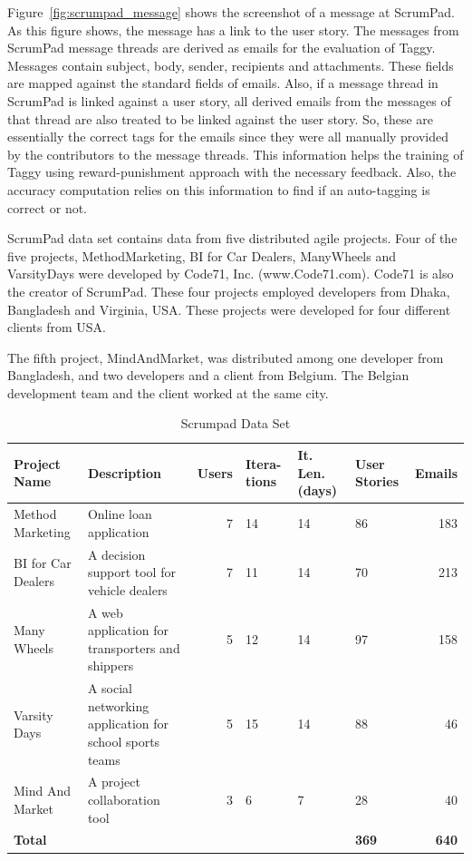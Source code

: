 Figure~\ref{fig:scrumpad_message} shows the screenshot of a message at ScrumPad. As this figure shows, the message has a link to the user story. The messages from ScrumPad message threads are derived as emails for the evaluation of Taggy. Messages contain subject, body, sender, recipients and attachments. These fields are mapped against the standard fields of emails. Also, if a message thread in ScrumPad is linked against a user story, all derived emails from the messages of that thread are also treated to be linked against the user story. So, these are essentially the correct tags for the emails since they were all manually provided by the contributors to the message threads. This information helps the training of Taggy using reward-punishment approach with the necessary feedback. Also, the accuracy computation relies on this information to find if an auto-tagging is correct or not.

ScrumPad data set contains data from five distributed agile projects. Four of the five projects, MethodMarketing, BI for Car Dealers, ManyWheels and VarsityDays were developed by Code71, Inc. (www.Code71.com). Code71 is also the creator of ScrumPad. These four projects employed developers from Dhaka, Bangladesh and Virginia, USA. These projects were developed for four different clients from USA.

The fifth project, MindAndMarket, was distributed among one developer from Bangladesh, and two developers and a client from Belgium. The Belgian development team and the client worked at the same city.

\begin{table}[h!]
  \centering
  \caption{Scrumpad Data Set}
	\label{tab:scrumpad_data_set}
    \begin{tabular}{|p{2cm}|p{4cm}|r|p{1cm}|p{1.2cm}|p{1.2cm}|r|}
      \hline
      \textbf{Project Name} & \textbf{Description} & \textbf{Users} & \textbf{Itera- tions} & \textbf{It. Len. (days)}  & \textbf{User Stories} & \textbf{Emails}\\
      \hline
      Method Marketing & Online loan application & 7 & 14 & 14 & 86 & 183 \\
      \hline
      BI for Car Dealers & A decision support tool for vehicle dealers & 7 & 11 & 14 & 70 & 213 \\
      \hline
      Many Wheels & A web application for transporters and shippers & 5 & 12 & 14 & 97 & 158 \\
      \hline
      Varsity Days & A social networking application for school sports teams & 5 & 15 & 14 & 88 & 46 \\
      \hline
      Mind And Market & A project collaboration tool & 3 & 6 & 7 & 28 & 40 \\
      \hline
      \textbf{Total} &  &  &  &  & \textbf{369} & \textbf{640}\\
      \hline
    \end{tabular}
\end{table}

